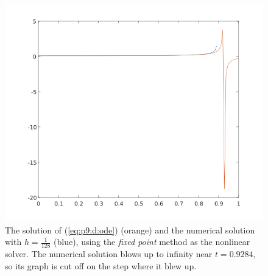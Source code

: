\documentclass{homework}
\begin{document}
\begin{alphaparts}
			\begin{figure}[H]
				\centering
				\includegraphics[width=\linewidth]{plot_p9d_fixed.png}
				\caption{The solution of (\ref{eq:p9:d:ode}) (orange) and the numerical solution with $h=\frac{1}{128}$ (blue), using the \textit{fixed point} method as the nonlinear solver. The numerical solution blows up to infinity near $t=0.9284$, so its graph is cut off on the step where it blew up.}
				\label{fig:p9d_fixed}
			\end{figure}
			
		\end{alphaparts}
\end{document}
